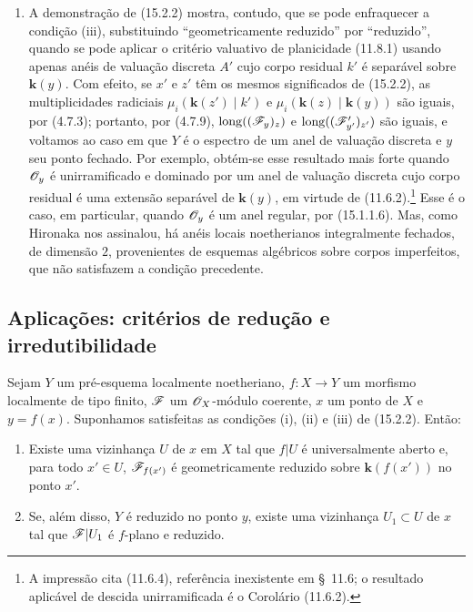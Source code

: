\begin{remarks}[15.2.4]
\begin{enumerate}[label=(\roman*)]
  \item A demonstração de (15.2.2) mostra, contudo, que se pode enfraquecer a condição (iii), substituindo “geometricamente reduzido” por “reduzido”, quando se pode aplicar o critério valuativo de planicidade (11.8.1) usando apenas anéis de valuação discreta $A'$ cujo corpo residual $k'$ é separável sobre $\mathbf{k}(y)$. Com efeito, se $x'$ e $z'$ têm os mesmos significados de (15.2.2), as multiplicidades radiciais $\mu_i(\mathbf{k}(z')\mid k')$ e $\mu_i(\mathbf{k}(z)\mid\mathbf{k}(y))$ são iguais, por (4.7.3); portanto, por (4.7.9), $\operatorname{long}((\mathscr{F}_y)_z)$ e $\operatorname{long}((\mathscr{F}'_{y'})_{z'})$ são iguais, e voltamos ao caso em que $Y$ é o espectro de um anel de valuação discreta e $y$ seu ponto fechado. Por exemplo, obtém-se esse resultado mais forte quando $\mathscr{O}_y$ é unirramificado e dominado por um anel de valuação discreta cujo corpo residual é uma extensão separável de $\mathbf{k}(y)$, em virtude de (11.6.2).\footnote{A impressão cita (11.6.4), referência inexistente em \S~11.6; o resultado aplicável de descida unirramificada é o Corolário (11.6.2).} Esse é o caso, em particular, quando $\mathscr{O}_y$ é um anel regular, por (15.1.1.6). Mas, como Hironaka nos assinalou, há anéis locais noetherianos integralmente fechados, de dimensão $2$, provenientes de esquemas algébricos sobre corpos imperfeitos, que não satisfazem a condição precedente.
\end{enumerate}
\end{remarks}

\subsection{Aplicações: critérios de redução e irredutibilidade}
\label{subsection:IV.15.3}

\begin{proposition}[15.3.1]
\label{IV.15.3.1}
Sejam $Y$ um pré-esquema localmente noetheriano, $f:X\to Y$ um morfismo localmente de tipo finito, $\mathscr{F}$ um $\mathscr{O}_X$-módulo coerente, $x$ um ponto de $X$ e $y=f(x)$.
Suponhamos satisfeitas as condições (i), (ii) e (iii) de (15.2.2). Então:
\begin{enumerate}[label=(\roman*)]
  \item Existe uma vizinhança $U$ de $x$ em $X$ tal que $f|U$ é universalmente aberto e, para todo $x'\in U$, $\mathscr{F}_{f(x')}$ é geometricamente reduzido sobre $\mathbf{k}(f(x'))$ no ponto $x'$.
  \item Se, além disso, $Y$ é reduzido no ponto $y$, existe uma vizinhança $U_1\subset U$ de $x$ tal que $\mathscr{F}|U_1$ é $f$-plano e reduzido.
\end{enumerate}
\end{proposition}

